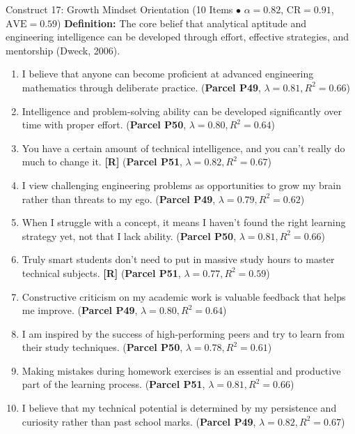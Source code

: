 \documentclass[10pt,a4paper]{article}
\begin{document}
\vspace{0.2cm}
\begin{constructbox}{Construct 17: Growth Mindset Orientation (10 Items $\bullet$ $\alpha = 0.82$, $\text{CR} = 0.91$, $\text{AVE} = 0.59$)}
\textbf{Definition:} The core belief that analytical aptitude and engineering intelligence can be developed through effort, effective strategies, and mentorship (Dweck, 2006).
\begin{enumerate}[label=\textbf{Q\arabic*.}, leftmargin=2.5em, itemsep=2pt, resume]
  \item I believe that anyone can become proficient at advanced engineering mathematics through deliberate practice. \hfill (\textbf{Parcel P49}, $\lambda = 0.81, R^2 = 0.66$)
  \item Intelligence and problem-solving ability can be developed significantly over time with proper effort. \hfill (\textbf{Parcel P50}, $\lambda = 0.80, R^2 = 0.64$)
  \item You have a certain amount of technical intelligence, and you can't really do much to change it. \textbf{[R]} \hfill (\textbf{Parcel P51}, $\lambda = 0.82, R^2 = 0.67$)
  \item I view challenging engineering problems as opportunities to grow my brain rather than threats to my ego. \hfill (\textbf{Parcel P49}, $\lambda = 0.79, R^2 = 0.62$)
  \item When I struggle with a concept, it means I haven't found the right learning strategy yet, not that I lack ability. \hfill (\textbf{Parcel P50}, $\lambda = 0.81, R^2 = 0.66$)
  \item Truly smart students don't need to put in massive study hours to master technical subjects. \textbf{[R]} \hfill (\textbf{Parcel P51}, $\lambda = 0.77, R^2 = 0.59$)
  \item Constructive criticism on my academic work is valuable feedback that helps me improve. \hfill (\textbf{Parcel P49}, $\lambda = 0.80, R^2 = 0.64$)
  \item I am inspired by the success of high-performing peers and try to learn from their study techniques. \hfill (\textbf{Parcel P50}, $\lambda = 0.78, R^2 = 0.61$)
  \item Making mistakes during homework exercises is an essential and productive part of the learning process. \hfill (\textbf{Parcel P51}, $\lambda = 0.81, R^2 = 0.66$)
  \item I believe that my technical potential is determined by my persistence and curiosity rather than past school marks. \hfill (\textbf{Parcel P49}, $\lambda = 0.82, R^2 = 0.67$)
\end{enumerate}
\end{constructbox}
\end{document}
